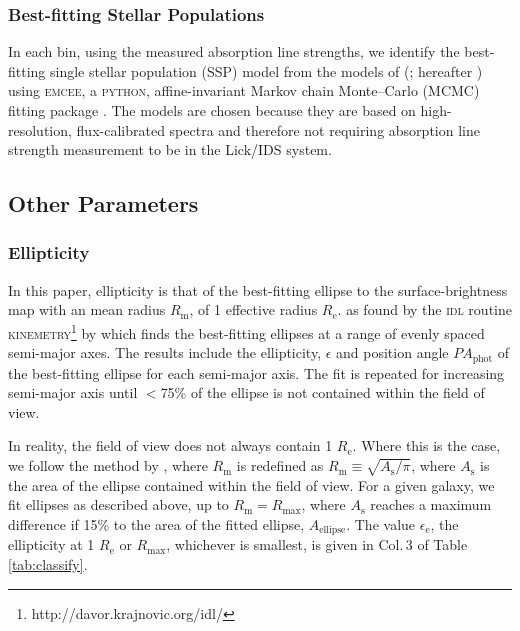 \documentclass[a4paper,fleqn,usenatbib]{mnras}
\begin{document}
	\subsubsection{Best-fitting Stellar Populations}
		\label{subsubsec:stellarPop}
		In each bin, using the measured absorption line strengths, we identify the best-fitting single stellar population (SSP) model from the models of \citeauthor{Thomas2010} (\citeyear{Thomas2010}; hereafter ) using \textsc{emcee}, a \textsc{python}, affine-invariant Markov chain Monte--Carlo (MCMC) fitting package \citep{Foreman-Mackey2013}. The  models are chosen because they are based on high-resolution, flux-calibrated spectra and therefore not requiring absorption line strength measurement to be in the Lick/IDS system.

	\subsection{Other Parameters}
		\subsubsection{Ellipticity}
			In this paper, ellipticity is that of the best-fitting ellipse to the surface-brightness map with an mean radius $R_\text{m}$, of 1 effective radius $R_\text{e}$. %
			as found by the \textsc{idl} routine \textsc{kinemetry}\footnote{http://davor.krajnovic.org/idl/} by \citet{Krajnovic2006} which finds the best-fitting ellipses at a range of evenly spaced semi-major axes. %
			The results include the ellipticity, $\epsilon$ and position angle $PA_\text{phot}$ of the best-fitting ellipse for each semi-major axis. The fit is repeated for increasing semi-major axis until $<$75\% of the ellipse is not contained within the field of view.

			In reality, the field of view does not always contain 1 $R_\text{e}$. Where this is the case, we follow the method by \citet{Emsellem2007}, where $R_\text{m}$ is redefined as $R_\text{m} \equiv \sqrt{A_\text{s}/\pi}$, where $A_\text{s}$ is the area of the ellipse contained within the field of view. For a given galaxy, we fit ellipses as described above, up to $R_\text{m} = R_\text{max}$, where $A_\text{s}$ reaches a maximum difference if 15\% to the area of the fitted ellipse, $A_\text{ellipse}$. The value $\epsilon_\text{e}$, the ellipticity at 1 $R_\text{e}$ or $R_\text{max}$, whichever is smallest, is given in Col.\,3 of Table \ref{tab:classify}. 
\end{document}
